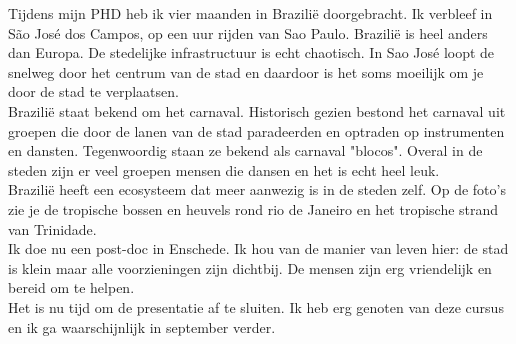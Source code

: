 \documentclass[30pt]{article}
\begin{document}
	Tijdens mijn PHD heb ik vier maanden in Brazilië doorgebracht. Ik verbleef in São José dos Campos, op een uur rijden van Sao Paulo. Brazilië is heel anders dan Europa. De stedelijke infrastructuur is echt chaotisch. In Sao José loopt de snelweg door het centrum van de stad en daardoor is het soms moeilijk om je door de stad te verplaatsen. \\
	
	Brazilië staat bekend om het carnaval. Historisch gezien bestond het carnaval uit groepen die door de lanen van de stad paradeerden en optraden op instrumenten en dansten. Tegenwoordig staan ze bekend als carnaval "blocos". Overal in de steden zijn er veel groepen mensen die dansen en het is echt heel leuk. \\
	
	Brazilië heeft een ecosysteem dat meer aanwezig is in de steden zelf. Op de foto's zie je de tropische bossen en heuvels rond rio de Janeiro en het tropische strand van Trinidade. \\
	
	Ik doe nu een post-doc in Enschede. Ik hou van de manier van leven hier: de stad is klein maar alle voorzieningen zijn dichtbij. De mensen zijn erg vriendelijk en bereid om te helpen. \\
	
	Het is nu tijd om de presentatie af te sluiten. Ik heb erg genoten van deze cursus en ik ga waarschijnlijk in september verder.     
	
\end{document}
